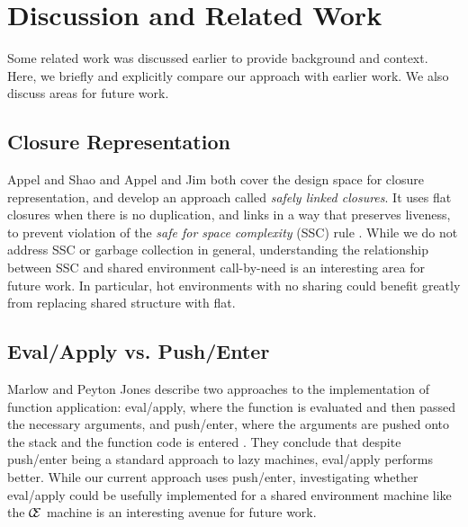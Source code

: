\section{Discussion and Related Work} \label{sec:disc}

Some related work was discussed earlier to provide background and context. Here,
we briefly and explicitly compare our approach with earlier work. We also discuss
areas for future work.

\subsection{Closure Representation}
Appel and Shao \cite{shao1994space} and Appel and Jim \cite{appel1988optimizing}
both cover the design space for closure representation, and develop an approach
called \emph{safely linked closures}. It uses flat closures when
there is no duplication, and links in a way that preserves liveness, to prevent
violation of the \emph{safe for space complexity} (SSC) rule
\cite{appel1992compiling}. While we do not address SSC or garbage collection in
general, understanding the relationship between SSC and shared environment
call-by-need is an interesting area for future work. In particular, hot
environments with no sharing could benefit greatly from replacing shared
structure with flat.

\subsection{Eval/Apply vs. Push/Enter}
Marlow and Peyton Jones describe two approaches to the implementation of
function application: eval/apply, where the function is evaluated and then
passed the necessary arguments, and push/enter, where the arguments are pushed
onto the stack and the function code is entered \cite{marlow2006making}. They
conclude that despite push/enter being a standard approach to lazy machines,
eval/apply performs better. While our current approach uses push/enter,
investigating whether eval/apply could be usefully implemented for a shared
environment machine like the $\mathcal{\mathcal{C} \mskip -4mu \mathcal{E}}$
machine is an interesting avenue for future work.

